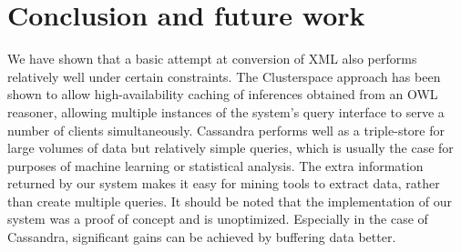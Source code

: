 \documentclass[conference]{IEEEtran}
\begin{document}
%
%
%

\section{Conclusion and future work}
We have shown that a basic attempt at conversion of XML also performs relatively well under certain constraints. The Clusterspace approach has been shown to allow high-availability caching of inferences obtained from an OWL reasoner, allowing multiple instances of the system's query interface to serve a number of clients simultaneously. Cassandra performs well as a triple-store for large volumes of data but relatively simple queries, which is usually the case for purposes of machine learning or statistical analysis. The extra information returned by our system makes it easy for mining tools to extract data, rather than create multiple queries. It should be noted that the implementation of our system was a proof of concept and is unoptimized. Especially in the case of Cassandra, significant gains can be achieved by buffering data better.
\end{document}
